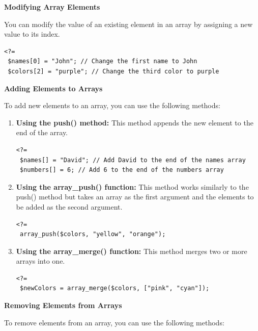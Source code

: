\documentclass[11pt]{article}
\begin{document}
\textbf{Modifying Array Elements}

You can modify the value of an existing element in an array by assigning
a new value to its index.

\begin{verbatim}
<?=
 $names[0] = "John"; // Change the first name to John
 $colors[2] = "purple"; // Change the third color to purple
\end{verbatim}

\textbf{Adding Elements to Arrays}

To add new elements to an array, you can use the following methods:

\begin{enumerate}
\item \textbf{Using the push() method:} This method appends the new element to the
end of the array.
\begin{verbatim}
<?=
 $names[] = "David"; // Add David to the end of the names array
 $numbers[] = 6; // Add 6 to the end of the numbers array
\end{verbatim}

\item \textbf{Using the array\_push() function:} This method works similarly to the
push() method but takes an array as the first argument and the
elements to be added as the second argument.
\begin{verbatim}
<?=
 array_push($colors, "yellow", "orange");
\end{verbatim}

\item \textbf{Using the array\_merge() function:} This method merges two or more
arrays into one.
\begin{verbatim}
<?=
 $newColors = array_merge($colors, ["pink", "cyan"]);
\end{verbatim}
\end{enumerate}

\textbf{Removing Elements from Arrays}

To remove elements from an array, you can use the following methods:
\end{document}
